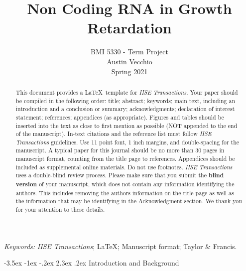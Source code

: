 \documentclass[11pt]{article}
\makeatletter
\renewcommand\section{\@startsection {section}{1}{\z@}%
                                       {-3.5ex \@plus -1ex \@minus -.2ex}%
                                       {2.3ex \@plus.2ex}%
                                       {\normalfont\fontfamily{phv}\fontsize{16}{19}\bfseries}}
\makeatother
\begin{document}
		
	\def\spacingset#1{\renewcommand{\baselinestretch}%
		{#1}\small\normalsize} \spacingset{1}
		
    \title{Non Coding RNA in Growth Retardation}
    \author{BMI 5330 - Term Project \\
    Austin Vecchio \\
    Spring 2021 }
    \date{}
    \maketitle
		
		
	\begin{abstract}
This document provides a \LaTeX \ template for \emph{IISE Transactions}. Your paper should be compiled in the following order: title; abstract; keywords; main text, including an introduction and a conclusion or summary; acknowledgments; declaration of interest statement; references; appendices (as appropriate). Figures and tables should be inserted into the text as close to first mention as possible (NOT appended to the end of the manuscript). In-text citations and the reference list must follow \emph{IISE Transactions} guidelines. Use 11 point font, 1 inch margins, and double-spacing for the manuscript. A typical paper for this journal should be no more than 30 pages in manuscript format, counting from the title page to references. Appendices should be included as supplemental online materials. Do not use footnotes. \emph{IISE Transactions} uses a double-blind review process. Please make sure that you submit the \textbf{blind version} of your manuscript, which does not contain any information identifying the authors.  This includes removing the authors information on the title page as well as the information that may be identifying in the Acknowledgment section. We thank you for your attention to these details.
	\end{abstract}
			
	\noindent%
	{\it Keywords:} \emph{IISE Transactions}; \LaTeX; Manuscript format; Taylor \& Francis.

	\spacingset{1.5} %


\section{Introduction and Background} \label{s:intro}
\end{document}
